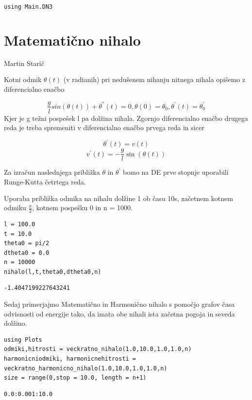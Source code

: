 \documentclass[12pt,a4paper]{article}
\begin{document}
\begin{verbatim}
using Main.DN3
\end{verbatim}

\section{Matematično nihalo}
Martin Starič

Kotni odmik $\theta(t)$ (v radianih) pri nedušenem nihanju nitnega nihala opišemo z diferencialno enačbo

\[
\frac{g}{l} sin(\theta(t)) + \theta^{''}(t) = 0, \theta(0) = \theta_0, \theta^{'}(t) = \theta^{'}_0
\]
Kjer je g težni pospešek l pa dolžina nihala. Zgornjo diferencialno enačbo drugega reda je treba spremeniti v diferencialno enačbo prvega reda in sicer

\[
\theta^{\prime}(t) = v(t)
\]
\[
v^{\prime}(t) = -\frac{g}{l} \sin(\theta(t))
\]

Za izračun naslednjega približka $\theta$ in $\theta^{'}$ bomo na DE prve stopnje uporabili Runge-Kutta četrtega reda. 


Uporaba približka odmika na nihalu dolžine 1 ob času 10s, začetnem kotnem odmiku $\frac{\pi}{2}$, kotnem pospešku 0 in n = 1000.


\begin{verbatim}
l = 100.0
t = 10.0
theta0 = pi/2
dtheta0 = 0.0
n = 10000
nihalo(l,t,theta0,dtheta0,n)
\end{verbatim}
\begin{verbatim}
-1.4047199227643241
\end{verbatim}

Sedaj primerjajmo Matematično in Harmonično nihalo s pomočjo grafov časa odvisnosti od energije tako, da imata obe nihali ista začetna pogoja in seveda dolžino.


\begin{verbatim}
using Plots
odmiki,hitrosti = veckratno_nihalo(1.0,10.0,1.0,1.0,n)
harmonicniodmiki, harmonicnehitrosti = veckratno_harmonicno_nihalo(1.0,10.0,1.0,1.0,n)
size = range(0,stop = 10.0, length = n+1)
\end{verbatim}
\begin{verbatim}
0.0:0.001:10.0
\end{verbatim}
\end{document}
